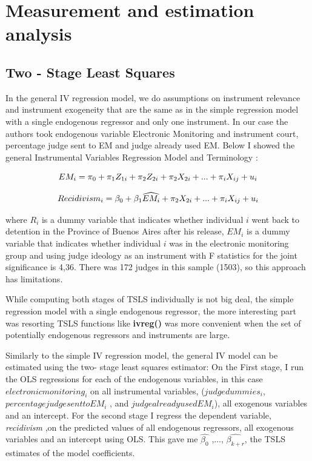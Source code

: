 \documentclass[a4paper,12pt]{article}
\begin{document}
\section{Measurement and estimation analysis}
\subsection{Two - Stage Least Squares}

In the general IV regression model, we do assumptions  on instrument relevance and instrument exogeneity that are the same as in the simple regression model with a single endogenous regressor and only one instrument. In our case the authors took endogenous variable Electronic Monitoring and instrument court, percentage judge sent to EM and judge already used EM. Below I showed the general Instrumental Variables Regression Model and Terminology : 

         \begin{equation}
    \centering
    EM_i = \pi_0 + \pi_1Z_{1i} + \pi_2Z_{2i} + \pi_2X_{2i} + ... + \pi_iX_{ij} + u_i  
    \end{equation}
    
        
         \begin{equation}
    \centering
    Recidivism_i = \beta_0 + \beta_1\widehat{EM_i} + \pi_2X_{2i} + ... + \pi_iX_{ij} + u_i  
\end{equation}

where $R_i$ is a dummy variable that indicates whether individual $i$ went back to detention in the Province of Buenos Aires after his release, $EM_i$ is a dummy variable that indicates whether individual $i$ was in the electronic monitoring group and using judge ideology as an instrument with F statistics for the joint significance is 4,36. There was 172 judges in this sample (1503), so this approach has limitations. 

While computing both stages of TSLS individually is not big deal, the simple regression model with a single endogenous regressor, the more interesting part was resorting TSLS functions like \textbf{ivreg()} was more convenient when the set of potentially endogenous regressors and instruments are large. 

Similarly to the simple IV regression model, the general IV model can be estimated using the two- stage least squares estimator: On the First stage, I run the OLS regressions for each of the endogenous variables, in this case $electronic monitoring_i$ on all instrumental variables, ($judge dummies_i$, $percentage judge sent to EM_i$ , and $judge already used EM_i$), all exogenous variables and an intercept. For the second stage I regress the dependent variable, \textit{recidivism} ,on the predicted values of all endogenous regressors, all exogenous variables and an intercept using OLS. This gave me $\widehat{\beta_0}$ ,..., $\widehat{\beta_{k+r}}$, the TSLS estimates of the model coefficients. 
\end{document}
